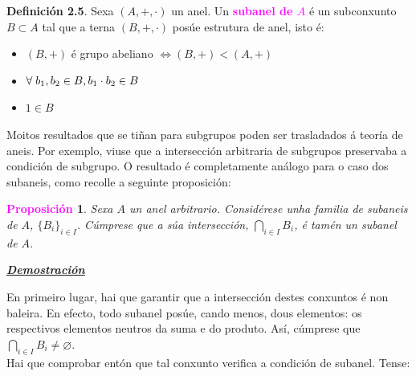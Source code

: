 \documentclass[twoside]{report}
\newcommand{\magbf}[1]{\textcolor{magenta}{\textbf{#1}}} %
\theoremstyle{mystyle}
\newtheorem{prop}{\magbf{Proposición}}[chapter]
\newenvironment{proposition}
{\begin{mdframed}[linecolor = magenta,backgroundcolor = classicrose, linewidth = 2mm]\begin{prop}}
{\end{prop}\end{mdframed}}
\begin{document}
\noindent \textbf{Definición 2.5}. Sexa $(A,+,\cdot)$ un anel. Un \magbf{subanel de $A$} é un subconxunto $B \subset A$ tal que a terna $(B,+,\cdot)$ posúe estrutura de anel, isto é:\\

\begin{itemize}
    \item $(B,+)$ é grupo abeliano $\Longleftrightarrow (B,+) < (A,+)$
    \item $\forall \hspace{1mm} b_{1},b_{2} \in B, b_{1} \cdot b_{2} \in B$
    \item $1 \in B$\\
\end{itemize}

\noindent Moitos resultados que se tiñan para subgrupos poden ser trasladados á teoría de aneis. Por exemplo, viuse  que a intersección arbitraria de subgrupos preservaba a condición de subgrupo. O resultado é completamente análogo para o caso dos subaneis, como recolle a seguinte proposición:

\pagebreak

\begin{proposition} \label{prop2.1}
Sexa $A$ un anel arbitrario. Considérese unha familia de subaneis de $A$, $\{B_{i}\}_{i \in I}$. Cúmprese que a súa intersección, $\underset{i \in I}{\bigcap}B_{i}$, é tamén un subanel de $A$.
\end{proposition}

\vspace{2mm}

\noindent \textbf{\textit{\underline{Demostración}}}

\vspace{2mm}

\noindent En primeiro lugar, hai que garantir que a intersección destes conxuntos é non baleira. En efecto, todo subanel posúe, cando menos, dous elementos: os respectivos elementos neutros da suma e do produto. Así, cúmprese que $\underset{i \in I}{\bigcap}B_{i} \neq \varnothing$.\\

\noindent Hai que comprobar entón que tal conxunto verifica a condición de subanel. Tense:
\end{document}
